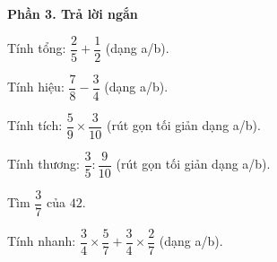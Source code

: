 \textbf{Phần 3. Trả lời ngắn}

\begin{ex} %
Tính tổng: $\dfrac{2}{5} + \dfrac{1}{2}$ (dạng a/b).
\end{ex}

\begin{ex} %
Tính hiệu: $\dfrac{7}{8} - \dfrac{3}{4}$ (dạng a/b).
\end{ex}

\begin{ex} %
Tính tích: $\dfrac{5}{9} \times \dfrac{3}{10}$ (rút gọn tối giản dạng a/b).
\end{ex}

\begin{ex} %
Tính thương: $\dfrac{3}{5} : \dfrac{9}{10}$ (rút gọn tối giản dạng a/b).
\end{ex}

\begin{ex} %
Tìm $\dfrac{3}{7}$ của $42$.
\end{ex}

\begin{ex} %
Tính nhanh: $\dfrac{3}{4} \times \dfrac{5}{7} + \dfrac{3}{4} \times \dfrac{2}{7}$ (dạng a/b).
\end{ex}

